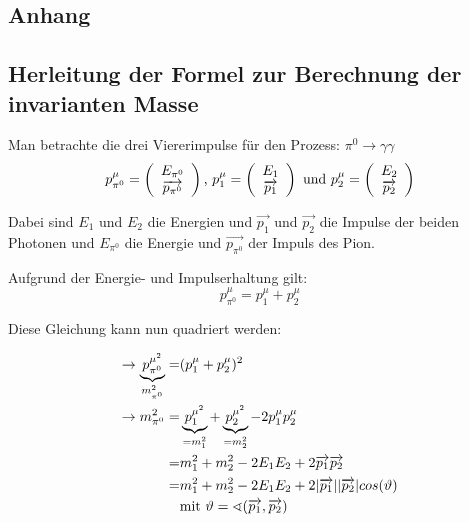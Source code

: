 \documentclass[a4paper,11pt,oneside,final,german,openbib,pdftex]{scrbook}
\begin{document}
{\begin{appendix}
\chapter{Anhang}
\section{Herleitung der Formel zur Berechnung der invarianten Masse}
\label{sec:Herleitung-der-Formel-zur-Berechnung-der-invarianten-Masse}

Man betrachte die drei Viererimpulse f\"ur den Prozess: $\pi^0\rightarrow \gamma\gamma $
\begin{equation}
p_{\pi^0}^{\mu}=\left(\begin{array}{c}E_{\pi^0}\\\overrightarrow{p_{\pi^0}}\end{array}\right) \textnormal{,  }
p_{1}^{\mu}=\left(\begin{array}{c}E_{1}\\\overrightarrow{p_{1}}\end{array}\right) \textnormal{ und  } p_{2}^{\mu}=\left(\begin{array}{c}E_{2}\\\overrightarrow{p_{2}}\end{array}\right)
\end{equation}

Dabei sind $E_{1}$ und $E_{2}$ die Energien und $\overrightarrow{p_{1}}$ und $\overrightarrow{p_{2}}$ die Impulse der beiden Photonen und $E_{\pi^0}$ die Energie und $\overrightarrow{p_{\pi^0}}$ der Impuls des Pion.

Aufgrund der Energie- und Impulserhaltung gilt:
\begin{equation}
p^{\mu}_{\pi^0} = p^{\mu}_1 + p^{\mu}_2
\end{equation}

Diese Gleichung kann nun quadriert werden:

\begin{equation}
\begin{split}
\rightarrow \underbrace{p^{\mu^2}_{\pi^0}}_{m_{\pi^0}^2}=& (p_{1}^{\mu}+p_{2}^{\mu})^2 \\ 
\rightarrow m_{\pi^0}^2=& \underbrace{p_{1}^{\mu^2}}_{=m_1^2}+\underbrace{p_{2}^{\mu^2}}_{=m_2^2}-2p_{1}^{\mu}p_{2}^{\mu} \\ 
=& m_1^2+m_2^2-2E_1E_2+2\overrightarrow{p_1}\overrightarrow{p_2} \\ 
=& m_1^2+m_2^2-2E_1E_2+2|\overrightarrow{p_1}| |\overrightarrow{p_2}| cos(\vartheta) \\
&\textnormal{mit } \vartheta=\sphericalangle(\overrightarrow{p_1},\overrightarrow{p_2})
\end{split}
\end{equation}


\end{appendix}}
\end{document}
